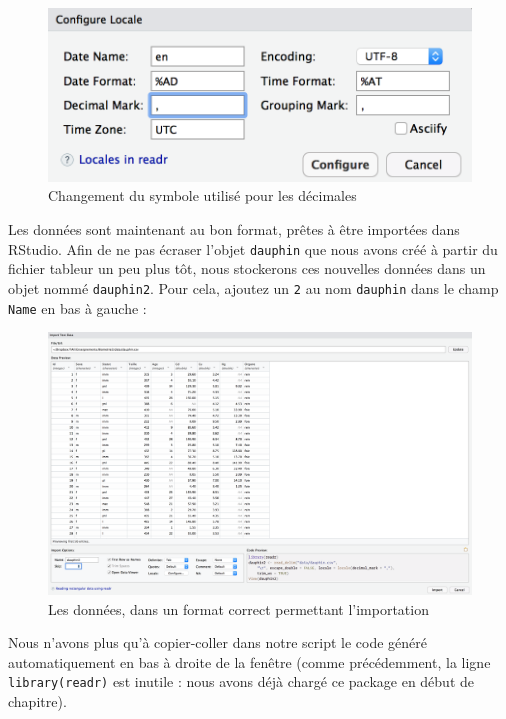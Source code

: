 \documentclass[a4paperpaper,]{article}
\begin{document}
\begin{figure}[htpb]

{\centering \includegraphics[width=0.5\linewidth]{images/importcsv3} 

}

\caption{Changement du symbole utilisé pour les décimales}\label{fig:importcsv3}
\end{figure}

Les données sont maintenant au bon format, prêtes à être importées dans RStudio. Afin de ne pas écraser l'objet \texttt{dauphin} que nous avons créé à partir du fichier tableur un peu plus tôt, nous stockerons ces nouvelles données dans un objet nommé \texttt{dauphin2}. Pour cela, ajoutez un \texttt{2} au nom \texttt{dauphin} dans le champ \texttt{Name} en bas à gauche :

\begin{figure}[htpb]

{\centering \includegraphics[width=1\linewidth]{images/importcsv4} 

}

\caption{Les données, dans un format correct permettant l'importation}\label{fig:importcsv4}
\end{figure}

Nous n'avons plus qu'à copier-coller dans notre script le code généré automatiquement en bas à droite de la fenêtre (comme précédemment, la ligne \texttt{library(readr)} est inutile : nous avons déjà chargé ce package en début de chapitre).
\end{document}
